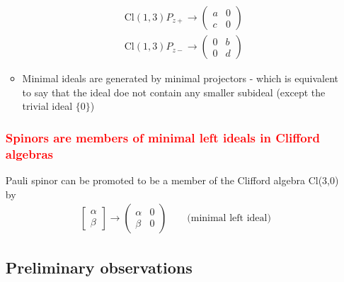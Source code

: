 \documentclass[../main.tex]{subfiles}
\begin{document}
\begin{itemize}
\begin{itemize}
\begin{align}
\text{Cl}(1,3)P_{z+}\rightarrow\left( 
\begin{matrix}
    a & 0 \\ 
    c  & 0 
\end{matrix} \right)\\
\text{Cl}(1,3)P_{z-}\rightarrow\left( 
\begin{matrix}
    0 & b \\ 
    0  & d 
\end{matrix} \right)
\end{align}
\item Minimal ideals are generated by minimal projectors - which  is equivalent to say that the ideal doe not contain any smaller subideal (except the trivial ideal $\{0\}$)
\end{itemize}

\subsubsection{\textcolor{red}{Spinors are members of minimal left ideals in Clifford algebras}}
Pauli spinor can be promoted to be a member of the Clifford algebra Cl(3,0) by
\begin{align}
\left[\begin{matrix}
\alpha\\
\beta
\end{matrix}\right]
\rightarrow
\left(\begin{matrix}
\alpha & 0\\
\beta & 0
\end{matrix}\right) \qquad\text{(minimal left ideal)}
\end{align}




\subsection{Preliminary observations}

\end{itemize}
\end{document}
